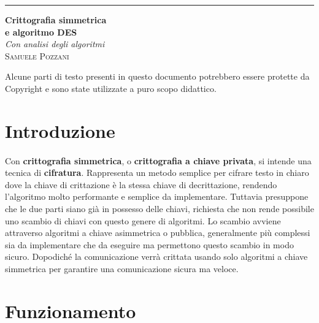 \documentclass{article}
\begin{document}
	\begin{titlepage}

		\raggedleft
	
		\rule{1pt}{\textheight} 
		\hspace{0.05\textwidth} 
		\parbox[b]{0.80\textwidth}{

			{\Huge\bfseries Crittografia simmetrica \\[0.5\baselineskip]e algoritmo DES}\\[2\baselineskip] 
			{\large\textit{Con analisi degli algoritmi}}\\[4\baselineskip] 
			{\Large\textsc{Samuele Pozzani}} 
			
			\vspace{0.5\textheight} 
			
			{\noindent Alcune parti di testo presenti in questo documento potrebbero essere protette da Copyright e sono state utilizzate a puro scopo didattico.}\\[\baselineskip]
		}

	\end{titlepage}
	\newpage

	\tableofcontents
	\newpage

	\section{Introduzione}

		\paragraph{}
		Con \textbf{crittografia simmetrica}, o \textbf{crittografia a chiave privata}, si intende una tecnica di \textbf{cifratura}. Rappresenta un metodo semplice per cifrare testo in chiaro dove la chiave di crittazione è la stessa chiave di decrittazione, rendendo l'algoritmo molto performante e semplice da implementare. Tuttavia presuppone che le due parti siano già in possesso delle chiavi, richiesta che non rende possibile uno scambio di chiavi con questo genere di algoritmi. Lo scambio avviene attraverso algoritmi a chiave asimmetrica o pubblica, generalmente più complessi sia da implementare che da eseguire ma permettono questo scambio in modo sicuro. Dopodiché la comunicazione verrà crittata usando solo algoritmi a chiave simmetrica per garantire una comunicazione sicura ma veloce.

	\section{Funzionamento}
\end{document}
